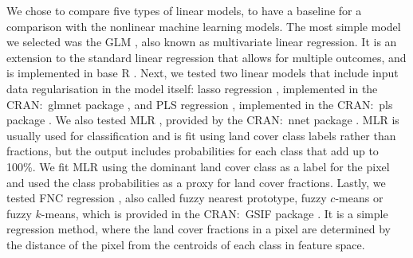 \documentclass[review,authoryear,3p]{elsarticle}
\newcommand{\cran}[1]{CRAN:~#1}
\begin{document}
We chose to compare five types of linear models, to have a baseline for a comparison with the nonlinear machine learning models.
The most simple model we selected was the \gls{GLM} \citep{neter_applied_1996}, also known as multivariate linear regression.
It is an extension to the standard linear regression that allows for multiple outcomes, and is implemented in base R \citep{r_2019}.
Next, we tested two linear models that include input data regularisation in the model itself: lasso regression \citep{tibshirani_regression_1996}, implemented in the \cran{glmnet} package \citep{glmnet}, and \gls{PLS} regression \citep{wold_pls-regression_2001}, implemented in the \cran{pls} package \citep{pls}.
We also tested \gls{MLR} \citep{theil_multinomial_1969}, provided by the \cran{nnet} package \citep{nnet}.
\gls{MLR} is usually used for classification and is fit using land cover class labels rather than fractions, but the output includes probabilities for each class that add up to 100\%.
We fit \gls{MLR} using the dominant land cover class as a label for the pixel and used the class probabilities as a proxy for land cover fractions.
Lastly, we tested \gls{FNC} regression \citep{keller_fuzzy_1985}, also called fuzzy nearest prototype, fuzzy $c$-means or fuzzy $k$-means, which is provided in the \cran{GSIF} package \citep{hengl2004fuzzycmeans}.
It is a simple regression method, where the land cover fractions in a pixel are determined by the distance of the pixel from the centroids of each class in feature space.


\end{document}
